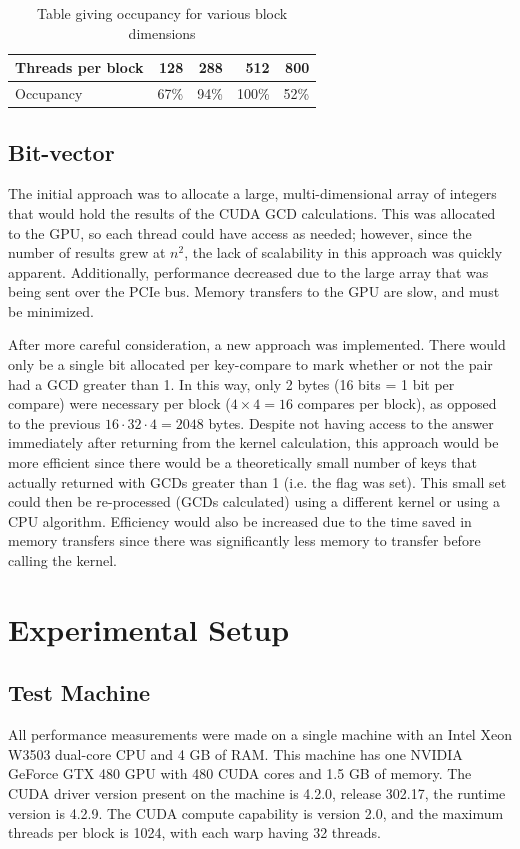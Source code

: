 \documentclass[10pt, conference]{./IEEEtran}
\begin{document}
\begin{table}
   \centering
   \begin{tabular}{l|rrrr}
      Threads per block & 128 & 288 & 512 & 800\\
      \hline
              Occupancy & 67\% & 94\% & 100\% & 52\%\\
   \end{tabular}
   \caption{Table giving occupancy for various block 
     dimensions\label{tab:occupancy}}
 
\end{table}

\subsection{Bit-vector}
The initial approach was to allocate a large, multi-dimensional array of 
integers that would hold the results of the CUDA GCD calculations. This was 
allocated to the GPU, so each thread could have access as needed; however, 
since the number of results grew at $n^2$, the lack of scalability in this 
approach was quickly apparent. Additionally, performance decreased due to the 
large array that was being sent over the PCIe bus. Memory transfers to 
the GPU are slow, and must be minimized.

After more careful consideration, a new approach was implemented. There would 
only be a single bit allocated per key-compare to mark whether or not the pair 
had a GCD greater than 1. In this way, only 2 bytes (16 bits = 1 bit per 
compare) were necessary per block ($4\times4 = 16$ compares per block), as 
opposed to the previous $16 \cdot 32 \cdot 4 = 2048$ bytes. Despite not having access 
to the answer immediately after returning from the kernel calculation, this 
approach would be more efficient since there would be a theoretically small 
number of keys that actually returned with GCDs greater than 1 (i.e. the flag 
was set). This small set could then be re-processed (GCDs calculated) using a 
different kernel or using a CPU algorithm. Efficiency would also be increased 
due to the time saved in memory transfers since there was significantly less 
memory to transfer before calling the kernel.

\section{Experimental Setup}
\subsection{Test Machine}
All performance measurements were made on a single machine with an Intel Xeon 
W3503 dual-core CPU and 4 GB of RAM. This machine has one NVIDIA GeForce
GTX 480 GPU with 480 CUDA cores and 1.5 GB of memory. The CUDA driver 
version present on the machine is 4.2.0, release 302.17, the runtime version is
4.2.9. The CUDA compute capability is version 2.0, and the maximum threads per 
block is 1024, with each warp having 32 threads.
\end{document}
